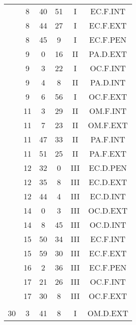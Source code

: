 \documentclass[12pt, a4paper]{article}
\begin{document}
\begin{multicols}{3}
{\begin{tabular}{c c c c c c}
	 	 	 	 & 8 & 40 & 51 & I & EC.F.INT\\%
	 	 	 	 & 8 & 44 & 27 & I & EC.F.EXT\\%
	 	 	 	 & 8 & 45 & 9 & I & EC.F.PEN\\%
	 	 	 	 & 9 & 0 & 16 & II & PA.D.EXT\\%
	 	 	 	 & 9 & 3 & 22 & I & OC.F.INT\\%
	 	 	 	 & 9 & 4 & 8 & II & PA.D.INT\\%
	 	 	 	 & 9 & 6 & 56 & I & OC.F.EXT\\%
	 	 	 	 & 11 & 3 & 29 & II & OM.F.INT\\%
	 	 	 	 & 11 & 7 & 23 & II & OM.F.EXT\\%
	 	 	 	 & 11 & 47 & 33 & II & PA.F.INT\\%
	 	 	 	 & 11 & 51 & 25 & II & PA.F.EXT\\%
	 	 	 	 & 12 & 32 & 0 & III & EC.D.PEN\\%
	 	 	 	 & 12 & 35 & 8 & III & EC.D.EXT\\%
	 	 	 	 & 12 & 44 & 4 & III & EC.D.INT\\%
	 	 	 	 & 14 & 0 & 3 & III & OC.D.EXT\\%
	 	 	 	 & 14 & 8 & 45 & III & OC.D.INT\\%
	 	 	 	 & 15 & 50 & 34 & III & EC.F.INT\\%
	 	 	 	 & 15 & 59 & 30 & III & EC.F.EXT\\%
	 	 	 	 & 16 & 2 & 36 & III & EC.F.PEN\\%
	 	 	 	 & 17 & 21 & 26 & III & OC.F.INT\\%
	 	 	 	 & 17 & 30 & 8 & III & OC.F.EXT\\%
	 	 	 	 & & & & & \\%
	 	 	 	30 & 3 & 41 & 8 & I & OM.D.EXT\\%

\end{tabular}}
\end{multicols}
\end{document}
